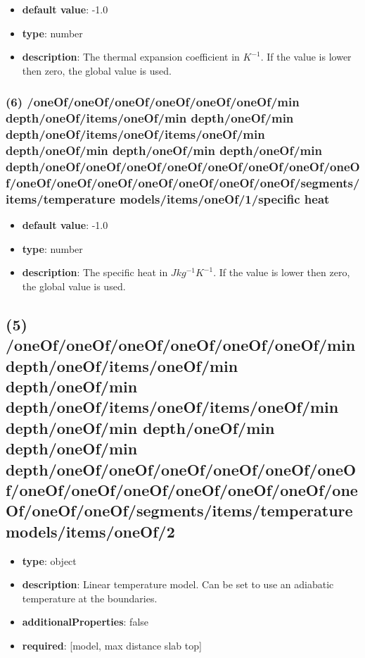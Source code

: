 \begin{itemize}[leftmargin=6em]\item {\bf default value}: -1.0
\item {\bf type}: number
\item {\bf description}: The thermal expansion coefficient in $K^{-1}$. If the value is lower then zero, the global value is used.
\end{itemize}\subsubsection{(6) /oneOf/oneOf/oneOf/oneOf/oneOf/oneOf/min depth/oneOf/items/oneOf/min depth/oneOf/min depth/oneOf/items/oneOf/items/oneOf/min depth/oneOf/min depth/oneOf/min depth/oneOf/min depth/oneOf/oneOf/oneOf/oneOf/oneOf/oneOf/oneOf/oneOf/oneOf/oneOf/oneOf/oneOf/oneOf/oneOf/oneOf/segments/items/temperature models/items/oneOf/1/specific heat}
\begin{itemize}[leftmargin=6em]\item {\bf default value}: -1.0
\item {\bf type}: number
\item {\bf description}: The specific heat in $J kg^{-1} K^{-1}$. If the value is lower then zero, the global value is used.
\end{itemize}\subsection{(5) /oneOf/oneOf/oneOf/oneOf/oneOf/oneOf/min depth/oneOf/items/oneOf/min depth/oneOf/min depth/oneOf/items/oneOf/items/oneOf/min depth/oneOf/min depth/oneOf/min depth/oneOf/min depth/oneOf/oneOf/oneOf/oneOf/oneOf/oneOf/oneOf/oneOf/oneOf/oneOf/oneOf/oneOf/oneOf/oneOf/oneOf/segments/items/temperature models/items/oneOf/2}
\begin{itemize}[leftmargin=5em]\item {\bf type}: object
\item {\bf description}: Linear temperature model. Can be set to use an adiabatic temperature at the boundaries.
\item {\bf additionalProperties}: false
\item {\bf required}: [model, max distance slab top]\end{itemize}
